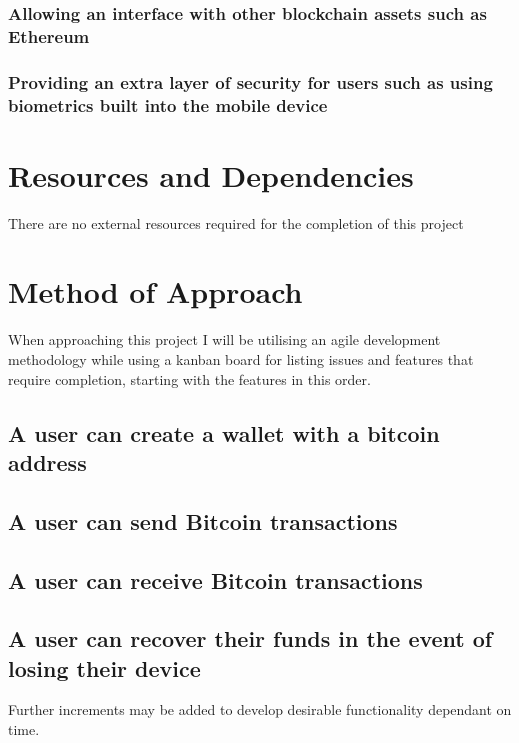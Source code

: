 \documentclass[11pt]{article}
\begin{document}
\subsubsection{Allowing an interface with other blockchain assets such as Ethereum}
\label{sec:orgf60c4d8}
\subsubsection{Providing an extra layer of security for users such as using biometrics built into the mobile device}
\label{sec:orgad38573}


\section{Resources and Dependencies}
\label{sec:orgb808604}
There are no external resources required for the completion of this project


\section{Method of Approach}
\label{sec:org755554d}
When approaching this project I will be utilising an agile development methodology while using a kanban board for
listing issues and features that require completion, starting with the features in this order.
\subsection{A user can create a wallet with a bitcoin address}
\label{sec:orgb63f69e}
\subsection{A user can send Bitcoin transactions}
\label{sec:org34be1ef}
\subsection{A user can receive Bitcoin transactions}
\label{sec:org5152bf4}
\subsection{A user can recover their funds in the event of losing their device}
\label{sec:orgabac6fd}

Further increments may be added to develop desirable functionality dependant on time.
\end{document}
